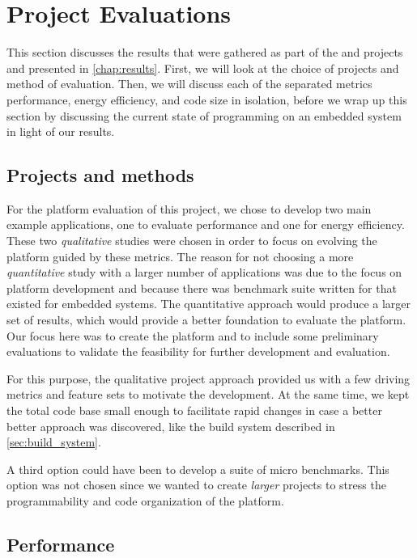 
\section{Project Evaluations}
\label{sec:disc:project_evaluations}

This section discusses the results that were gathered as part of the {\tracker} and {\cg} projects and presented in \autoref{chap:results}.
First, we will look at the choice of projects and method of evaluation.
Then, we will discuss each of the separated metrics performance, energy efficiency, and code size in isolation, before we wrap up this section by discussing the current state of {\rust} programming on an embedded system in light of our results.

\subsection{Projects and methods}

For the platform evaluation of this project, we chose to develop two main example applications, one to evaluate performance and one for energy efficiency.
These two \emph{qualitative} studies were chosen in order to focus on evolving the platform guided by these metrics.
The reason for not choosing a more \emph{quantitative} study with a larger number of applications was due to the focus on platform development and because there was benchmark suite written for {\rust} that existed for embedded systems.
The quantitative approach would produce a larger set of results, which would provide a better foundation to evaluate the platform.
Our focus here was to create the platform and to include some preliminary evaluations to validate the feasibility for further development and evaluation.

For this purpose, the qualitative project approach provided us with a few driving metrics and feature sets to motivate the development.
At the same time, we kept the total code base small enough to facilitate rapid changes in case a better better approach was discovered, like the build system described in \autoref{sec:build_system}.

A third option could have been to develop a suite of micro benchmarks.
This option was not chosen since we wanted to create \emph{larger} projects to stress the programmability and code organization of the platform.

\subsection{Performance}

